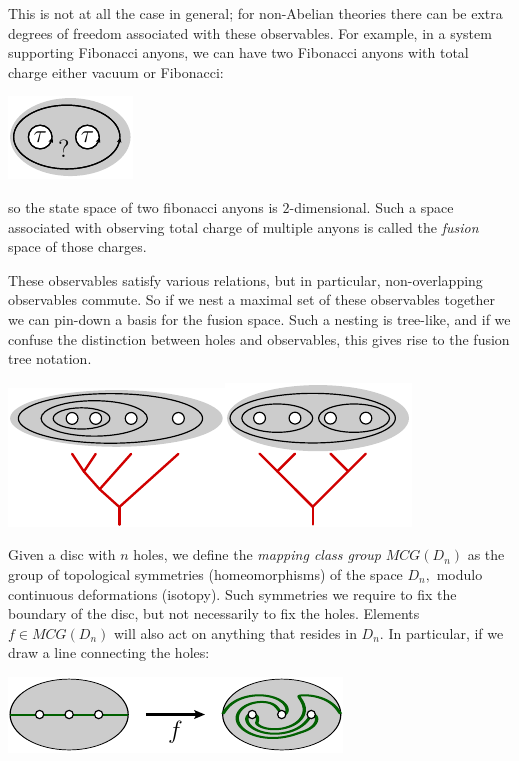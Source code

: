 \documentclass[aps, prl, letterpaper, twocolumn, superscriptaddress, notitlepage, 10pt]{revtex4-1}
\begin{document}
This is not at all the case in general;
for non-Abelian theories there can be extra
degrees of freedom associated with these
observables. For example, in
a system supporting Fibonacci anyons,
we can have two Fibonacci anyons with total
charge either vacuum or Fibonacci:
\begin{center}
\includegraphics[]{pic-fusion.pdf}
\end{center}
so the state space of two fibonacci anyons
is $2$-dimensional.
Such a space associated with observing total charge
of multiple anyons is called the \emph{fusion} space
of those charges.

These observables satisfy various relations,
but in particular, non-overlapping observables commute.
So if we nest a maximal set of these observables together
we can pin-down a basis for the fusion space.
Such a nesting is tree-like, and if we confuse the distinction
between holes and observables, this gives rise to the
fusion tree notation.
\begin{center}
\includegraphics[]{pic-tree-0.pdf}\includegraphics[]{pic-tree-1.pdf}
\end{center}

Given a disc with $n$ holes, we define the \emph{mapping
class group} $MCG(D_n)$ as the group of topological
symmetries (homeomorphisms) of the space $D_n,$
modulo continuous deformations (isotopy).
Such symmetries we require to fix the boundary
of the disc, but not necessarily to fix the holes.
Elements $f\in MCG(D_n)$ will also act on anything that
resides in $D_n.$ 
In particular, if we draw a line
connecting the holes:
\begin{center}
\includegraphics[]{pic-twist.pdf}
\end{center}
\end{document}
